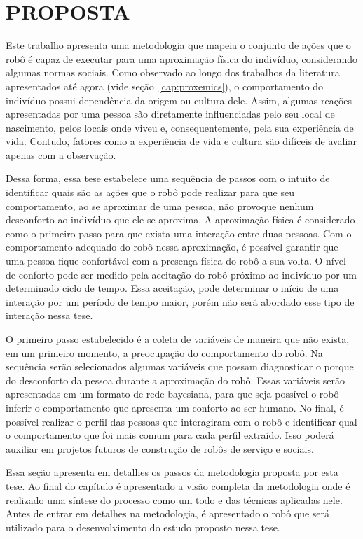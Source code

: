 \chapter{PROPOSTA}
\label{cap:proposta}

Este trabalho apresenta uma metodologia que mapeia o conjunto de ações que o robô é capaz de executar para uma aproximação física do indivíduo, considerando algumas normas sociais. Como observado ao longo dos trabalhos da literatura apresentados até agora (vide seção~\ref{cap:proxemics}), o comportamento do indivíduo possui dependência da origem ou cultura dele. Assim, algumas reações apresentadas por uma pessoa são diretamente influenciadas pelo seu local de nascimento, pelos locais onde viveu e, consequentemente, pela sua experiência de vida. Contudo, fatores como a experiência de vida e cultura são difíceis de avaliar apenas com a observação.

Dessa forma, essa tese estabelece uma sequência de passos com o intuito de identificar quais são as ações que o robô pode realizar para que seu comportamento, ao se aproximar de uma pessoa, não provoque nenhum desconforto ao indivíduo que ele se aproxima. A aproximação física é considerado como o primeiro passo para que exista uma interação entre duas pessoas. Com o comportamento adequado do robô nessa aproximação, é possível garantir que uma pessoa fique confortável com a presença física do robô a sua volta. O nível de conforto pode ser medido pela aceitação do robô próximo ao indivíduo por um determinado ciclo de tempo. Essa aceitação, pode determinar o início de uma interação por um período de tempo maior, porém não será abordado esse tipo de interação nessa tese.

O primeiro passo estabelecido é a coleta de variáveis de maneira que não exista, em um primeiro momento, a preocupação do comportamento do robô. Na sequência serão selecionados algumas variáveis que possam diagnosticar o porque do desconforto da pessoa durante a aproximação do robô. Essas variáveis serão apresentadas em um formato de rede bayesiana, para que seja possível o robô inferir o comportamento que apresenta um conforto ao ser humano. No final, é possível realizar o perfil das pessoas que interagiram com o robô e identificar qual o comportamento que foi mais comum para cada perfil extraído. Isso poderá auxiliar em projetos futuros de construção de robôs de serviço e sociais.

Essa seção apresenta em detalhes os passos da metodologia proposta por esta tese. Ao final do capítulo é apresentado a visão completa da metodologia onde é realizado uma síntese do processo como um todo e das técnicas aplicadas nele. Antes de entrar em detalhes na metodologia, é apresentado o robô que será utilizado para o desenvolvimento do estudo proposto nessa tese.

